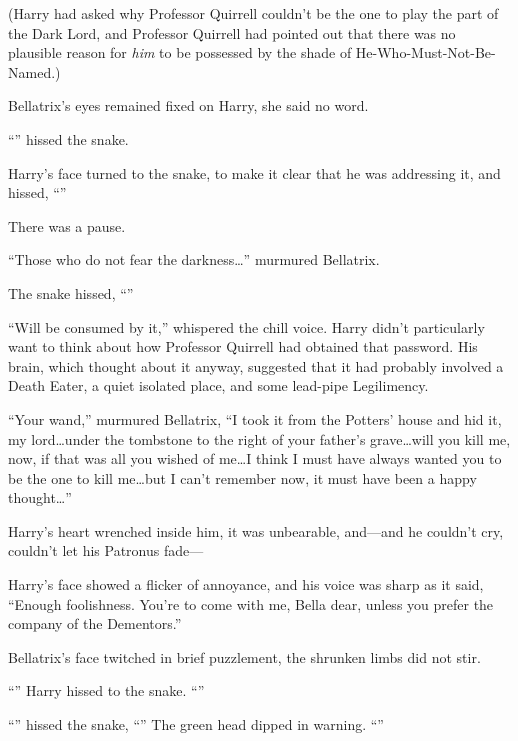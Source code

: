 (Harry had asked why Professor Quirrell couldn’t be the one to play the part of
the Dark Lord, and Professor Quirrell had pointed out that there was no
plausible reason for \emph{him} to be possessed by the shade of
He-Who-Must-Not-Be-Named.)

Bellatrix’s eyes remained fixed on Harry, she said no word.

“” hissed the snake.

Harry’s face turned to the snake, to make it clear that he was addressing it,
and hissed, “”

There was a pause.

“Those who do not fear the darkness…” murmured Bellatrix.

The snake hissed, “”

“Will be consumed by it,” whispered the chill voice. Harry didn’t particularly
want to think about how Professor Quirrell had obtained that password. His brain,
which thought about it anyway, suggested that it had probably involved a Death
Eater, a quiet isolated place, and some lead-pipe Legilimency.

“Your wand,” murmured Bellatrix, “I took it from the Potters’ house and hid it,
my lord…under the tombstone to the right of your father’s grave…will
you kill me, now, if that was all you wished of me…I think I must
have always wanted you to be the one to kill me…but I can’t remember
now, it must have been a happy thought…”

Harry’s heart wrenched inside him, it was unbearable, and—and he couldn’t
cry, couldn’t let his Patronus fade—

Harry’s face showed a flicker of annoyance, and his voice was sharp as it said,
“Enough foolishness. You’re to come with me, Bella dear, unless you prefer the
company of the Dementors.”

Bellatrix’s face twitched in brief puzzlement, the shrunken limbs did not stir.

“” Harry hissed to the snake. “”

“” hissed the snake, “” The green head dipped in warning.
“”

